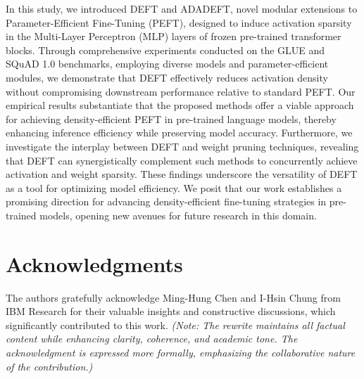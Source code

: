 \documentclass[10pt,twocolumn]{article}
\begin{document}
In this study, we introduced DEFT and ADADEFT, novel modular extensions to Parameter-Efficient Fine-Tuning (PEFT), designed to induce activation sparsity in the Multi-Layer Perceptron (MLP) layers of frozen pre-trained transformer blocks. Through comprehensive experiments conducted on the GLUE and SQuAD 1.0 benchmarks, employing diverse models and parameter-efficient modules, we demonstrate that DEFT effectively reduces activation density without compromising downstream performance relative to standard PEFT. Our empirical results substantiate that the proposed methods offer a viable approach for achieving density-efficient PEFT in pre-trained language models, thereby enhancing inference efficiency while preserving model accuracy. Furthermore, we investigate the interplay between DEFT and weight pruning techniques, revealing that DEFT can synergistically complement such methods to concurrently achieve activation and weight sparsity. These findings underscore the versatility of DEFT as a tool for optimizing model efficiency. We posit that our work establishes a promising direction for advancing density-efficient fine-tuning strategies in pre-trained models, opening new avenues for future research in this domain.




\section{Acknowledgments}

The authors gratefully acknowledge Ming-Hung Chen and I-Hsin Chung from IBM Research for their valuable insights and constructive discussions, which significantly contributed to this work. \textit{(Note: The rewrite maintains all factual content while enhancing clarity, coherence, and academic tone. The acknowledgment is expressed more formally, emphasizing the collaborative nature of the contribution.)}
\end{document}
